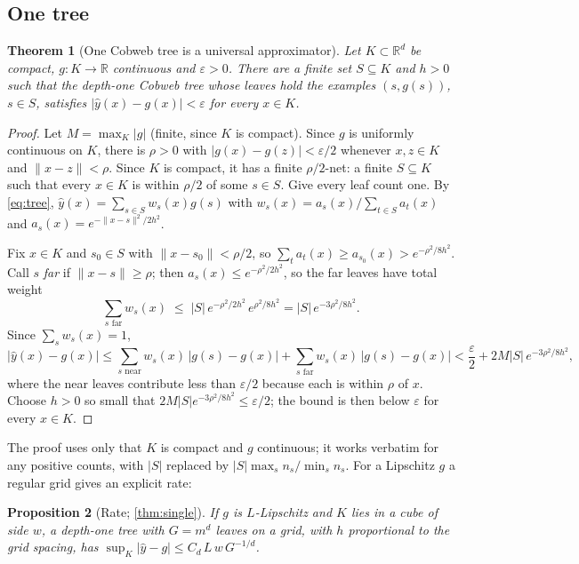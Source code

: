 \documentclass[11pt]{article}
\newtheorem{theorem}{Theorem}
\newtheorem{proposition}[theorem]{Proposition}
\theoremstyle{definition}
\theoremstyle{remark}
\newcommand{\R}{\mathbb{R}}
\newcommand{\hy}{\hat{y}}
\begin{document}
\subsection{One tree}

\begin{theorem}[One Cobweb tree is a universal approximator]\label{thm:univ-tree}
Let $K\subset\R^d$ be compact, $g:K\to\R$ continuous and $\varepsilon>0$.  There are a
finite set $S\subseteq K$ and $h>0$ such that the depth-one Cobweb tree whose leaves hold
the examples $(s,g(s))$, $s\in S$, satisfies $|\hy(x)-g(x)|<\varepsilon$ for every $x\in K$.
\end{theorem}

\begin{proof}
Let $M=\max_K|g|$ (finite, since $K$ is compact).  Since $g$ is uniformly continuous on
$K$, there is $\rho>0$ with $|g(x)-g(z)|<\varepsilon/2$ whenever $x,z\in K$ and
$\|x-z\|<\rho$.  Since $K$ is compact, it has a finite $\rho/2$-net: a finite $S\subseteq K$
such that every $x\in K$ is within $\rho/2$ of some $s\in S$.  Give every leaf count one.
By \eqref{eq:tree}, $\hy(x)=\sum_{s\in S}w_s(x)g(s)$ with
$w_s(x)=a_s(x)/\sum_{t\in S}a_t(x)$ and $a_s(x)=e^{-\|x-s\|^2/2h^2}$.

Fix $x\in K$ and $s_0\in S$ with $\|x-s_0\|<\rho/2$, so $\sum_ta_t(x)\ge a_{s_0}(x)>
e^{-\rho^2/8h^2}$.  Call $s$ \emph{far} if $\|x-s\|\ge\rho$; then $a_s(x)\le e^{-\rho^2/2h^2}$,
so the far leaves have total weight
\[
  \sum_{s\text{ far}}w_s(x)\;\le\;|S|\,e^{-\rho^2/2h^2}\,e^{\rho^2/8h^2}=|S|\,e^{-3\rho^2/8h^2}.
\]
Since $\sum_sw_s(x)=1$,
\[
  |\hy(x)-g(x)|\le\sum_{s\text{ near}}w_s(x)\,|g(s)-g(x)|+\sum_{s\text{ far}}w_s(x)\,|g(s)-g(x)|
  <\frac\varepsilon2+2M|S|\,e^{-3\rho^2/8h^2},
\]
where the near leaves contribute less than $\varepsilon/2$ because each is within $\rho$ of
$x$.  Choose $h>0$ so small that $2M|S|e^{-3\rho^2/8h^2}\le\varepsilon/2$; the bound is then
below $\varepsilon$ for every $x\in K$.
\end{proof}

The proof uses only that $K$ is compact and $g$ continuous; it works verbatim for any
positive counts, with $|S|$ replaced by $|S|\max_sn_s/\min_sn_s$.  For a Lipschitz $g$ a
regular grid gives an explicit rate:

\begin{proposition}[Rate; \cref{thm:single}]\label{prop:rate}
If $g$ is $L$-Lipschitz and $K$ lies in a cube of side $w$, a depth-one tree with
$G=m^d$ leaves on a grid, with $h$ proportional to the grid spacing, has
$\sup_K|\hy-g|\le C_d\,L\,w\,G^{-1/d}$.
\end{proposition}
\end{document}
